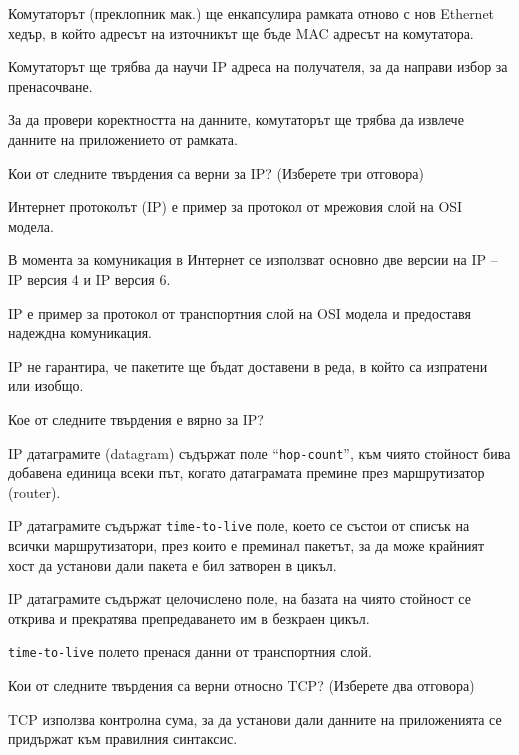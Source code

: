 \begin{questions}
\begin{choices}
    \CorrectChoice Комутаторът (преклопник мак.) ще енкапсулира рамката
    отново с нов Ethernet хедър, в който адресът на източникът ще бъде MAC
    адресът на комутатора.

    \CorrectChoice Комутаторът ще трябва да научи IP адреса на получателя, за да
    направи избор за пренасочване.

    \CorrectChoice За да провери коректността на данните, комутаторът ще трябва
    да извлече данните на приложението от рамката.
  \end{choices}

  \question[6] Кои от следните твърдения са верни за IP? (Изберете три отговора)
  \begin{choices}
    \CorrectChoice Интернет протоколът (IP) е пример за протокол от мрежовия
    слой на OSI модела.

    \CorrectChoice В момента за комуникация в Интернет се използват основно две
    версии на IP – IP версия 4 и IP версия 6.

    \choice IP е пример за протокол от транспортния слой на OSI модела и
    предоставя надеждна комуникация.

    \CorrectChoice IP не гарантира, че пакетите ще бъдат доставени в реда, в
    който са изпратени или изобщо.
  \end{choices}

  \question[6] Кое от следните твърдения е вярно за IP?
  \begin{choices}
    \choice IP датаграмите (\foreignlanguage{english}{datagram}) съдържат поле
    "`\texttt{\foreignlanguage{english}{hop-count}}"', към чиято стойност бива
    добавена единица всеки път, когато датаграмата премине през маршрутизатор
    (\foreignlanguage{english}{router}).

    \choice IP датаграмите съдържат
    \texttt{\foreignlanguage{english}{time-to-live}} поле, което се състои от
    списък на всички маршрутизатори, през които е преминал пакетът, за да може
    крайният хост да установи дали пакета е бил затворен в цикъл.

    \CorrectChoice IP датаграмите съдържат целочислено поле, на базата на чиято
    стойност се открива и прекратява препредаването им в безкраен цикъл.

    \choice \texttt{\foreignlanguage{english}{time-to-live}} полето пренася
    данни от транспортния слой.
  \end{choices}

  \question[6] Кои от следните твърдения са верни относно
  \foreignlanguage{english}{TCP}? (Изберете два отговора)
  \begin{choices}
    \choice \foreignlanguage{english}{TCP} използва контролна сума, за да
    установи дали данните на приложенията се придържат към правилния синтаксис.


\end{choices}
\end{questions}

